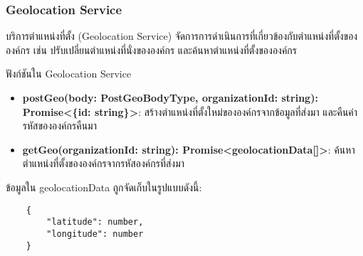 \subsubsection{Geolocation Service}
\ifenglish
\else
บริการตำแหน่งที่ตั้ง (Geolocation Service) จัดการการดำเนินการที่เกี่ยวข้องกับตำแหน่งที่ตั้งขององค์กร เช่น ปรับเปลี่ยนตำแหน่งที่นั่งขององค์กร และค้นหาตำแหน่งที่ตั้งขององค์กร

ฟังก์ชันใน Geolocation Service
\begin{itemize}
    \item \textbf{postGeo(body: PostGeoBodyType, organizationId: string): Promise<\{id: string\}>}: สร้างตำแหน่งที่ตั้งใหม่ขององค์กรจากข้อมูลที่ส่งมา และคืนค่ารหัสขององค์กรคืนมา
    \item \textbf{getGeo(organizationId: string): Promise<geolocationData[]>}: ค้นหาตำแหน่งที่ตั้งขององค์กรจากรหัสองค์กรที่ส่งมา
\end{itemize}

ข้อมูลใน geolocationData ถูกจัดเก็บในรูปแบบดังนี้:
\begin{lstlisting}
    {
        "latitude": number, 
        "longitude": number
    }
\end{lstlisting}
\fi